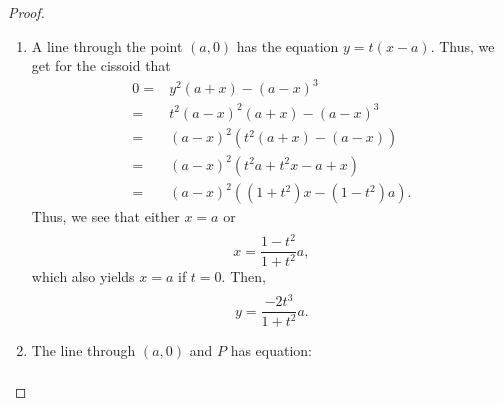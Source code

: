 \begin{proof}
\begin{enumerate}
    \item A line through the point $(a,0)$ has the equation $y = t(x-a)$. 
    Thus, we get for the cissoid that
    \begin{align*}
        0
        =& y^2 (a+x) - (a-x)^3\\
        =& t^2 (a-x)^2 (a+x) - (a-x)^3\\
        =& (a-x)^2 ( t^2 (a+x) - (a-x))\\
        =& (a-x)^2 ( t^2 a + t^2 x - a + x)\\
        =& (a-x)^2 ( (1+t^2)x - (1 - t^2)a).
    \end{align*}
    Thus, we see that either $x=a$ or
    \begin{align*}
        
    \end{align*}
    $$x = \frac{1-t^2}{1+t^2}a,$$
    which also yields $x=a$ if $t=0$. 
    Then,
    \begin{align*}
        
    \end{align*}
    $$y = \frac{-2t^3}{1+t^2}a.$$
    \item The line through $(a,0)$ and $P$ has equation:
    \begin{align*}
        

\end{align*}
\end{enumerate}
\end{proof}

